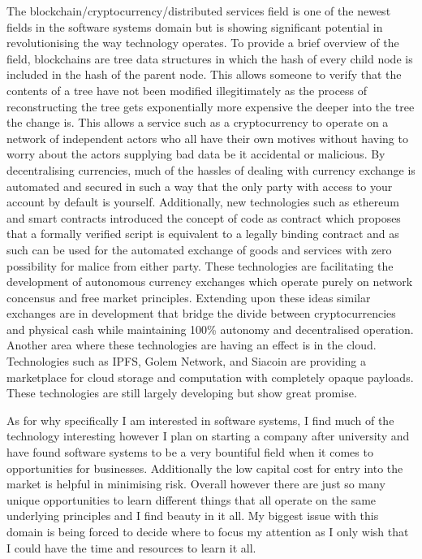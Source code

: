 \documentclass[12pt,letterpaper,titlepage]{report}
\begin{document}
\begin{raggedright}
The blockchain/cryptocurrency/distributed services field is one of the newest fields in the software systems domain but is showing significant potential in revolutionising the way technology operates. To provide a brief overview of the field, blockchains are tree data structures in which the hash of every child node is included in the hash of the parent node. This allows someone to verify that the contents of a tree have not been modified illegitimately as the process of reconstructing the tree gets exponentially more expensive the deeper into the tree the change is. This allows a service such as a cryptocurrency to operate on a network of independent actors who all have their own motives without having to worry about the actors supplying bad data be it accidental or malicious. By decentralising currencies, much of the hassles of dealing with currency exchange is automated and secured in such a way that the only party with access to your account by default is yourself. Additionally, new technologies such as ethereum and smart contracts introduced the concept of code as contract which proposes that a formally verified script is equivalent to a legally binding contract and as such can be used for the automated exchange of goods and services with zero possibility for malice from either party. These technologies are facilitating the development of autonomous currency exchanges which operate purely on network concensus and free market principles. Extending upon these ideas similar exchanges are in development that bridge the divide between cryptocurrencies and physical cash while maintaining 100\% autonomy and decentralised operation. Another area where these technologies are having an effect is in the cloud. Technologies such as IPFS, Golem Network, and Siacoin are providing a marketplace for cloud storage and computation with completely opaque payloads. These technologies are still largely developing but show great promise. 

As for why specifically I am interested in software systems, I find much of the technology interesting however I plan on starting a company after university and have found software systems to be a very bountiful field when it comes to opportunities for businesses. Additionally the low capital cost for entry into the market is helpful in minimising risk. Overall however there are just so many unique opportunities to learn different things that all operate on the same underlying principles and I find beauty in it all. My biggest issue with this domain is being forced to decide where to focus my attention as I only wish that I could have the time and resources to learn it all.







\end{raggedright}
\end{document}
